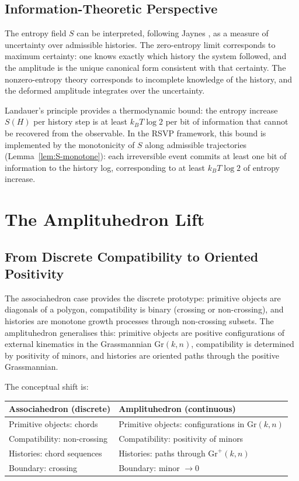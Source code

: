 \documentclass[12pt, oneside]{amsart}
\theoremstyle{plain}
\theoremstyle{definition}
\theoremstyle{remark}
\newcommand{\Gr}{\mathrm{Gr}}
\newcommand{\Sf}{S}         %
\begin{document}
\subsection{Information-Theoretic Perspective}

The entropy field $\Sf$ can be interpreted, following Jaynes \cite{Jaynes1957}, as a measure of uncertainty over admissible histories. The zero-entropy limit corresponds to maximum certainty: one knows exactly which history the system followed, and the amplitude is the unique canonical form consistent with that certainty. The nonzero-entropy theory corresponds to incomplete knowledge of the history, and the deformed amplitude integrates over the uncertainty.

Landauer's principle \cite{Landauer1961} provides a thermodynamic bound: the entropy increase $\Sf(H)$ per history step is at least $k_B T \log 2$ per bit of information that cannot be recovered from the observable. In the RSVP framework, this bound is implemented by the monotonicity of $\Sf$ along admissible trajectories (Lemma~\ref{lem:S-monotone}): each irreversible event commits at least one bit of information to the history log, corresponding to at least $k_B T \log 2$ of entropy increase.

\section{The Amplituhedron Lift}
\label{sec:amplituhedron}

\subsection{From Discrete Compatibility to Oriented Positivity}

The associahedron case provides the discrete prototype: primitive objects are diagonals of a polygon, compatibility is binary (crossing or non-crossing), and histories are monotone growth processes through non-crossing subsets. The amplituhedron generalises this: primitive objects are positive configurations of external kinematics in the Grassmannian $\Gr(k,n)$, compatibility is determined by positivity of minors, and histories are oriented paths through the positive Grassmannian.

The conceptual shift is:

\begin{center}
\begin{tabular}{ll}
\toprule
Associahedron (discrete) & Amplituhedron (continuous) \\
\midrule
Primitive objects: chords & Primitive objects: configurations in $\Gr(k,n)$ \\
Compatibility: non-crossing & Compatibility: positivity of minors \\
Histories: chord sequences & Histories: paths through $\mathrm{Gr}^+(k,n)$ \\
Boundary: crossing & Boundary: minor $\to 0$ \\
\bottomrule
\end{tabular}
\end{center}
\end{document}
